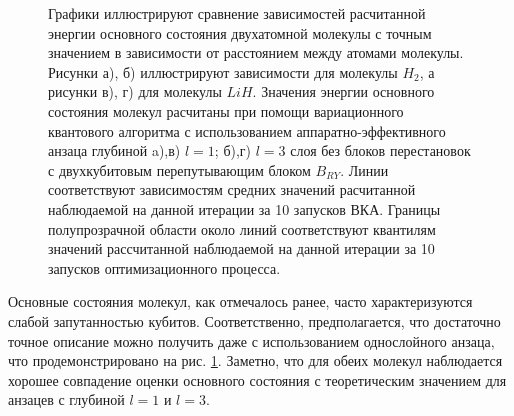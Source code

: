\documentclass[14pt]{extarticle}
\begin{document}
\begin{figure}[H]
\begin{minipage}[H]{0.48\linewidth}
\end{minipage}
\caption{Графики иллюстрируют сравнение зависимостей расчитанной энергии основного состояния двухатомной молекулы с точным значением в зависимости от расстоянием между атомами молекулы. Рисунки а), б) иллюстрируют зависимости для молекулы $H_2$, а рисунки в), г) для молекулы $LiH$. Значения энергии основного состояния молекул расчитаны при помощи вариационного квантового алгоритма с использованием аппаратно-эффективного анзаца глубиной a),в) $l = 1$; б),г) $l = 3$ слоя без блоков перестановок с двухкубитовым перепутывающим блоком $B_{RY}$. Линии соответствуют зависимостям средних значений расчитанной наблюдаемой на данной итерации за 10 запусков ВКА. Границы полупрозрачной области около линий соответствуют квантилям значений рассчитанной наблюдаемой на данной итерации за 10 запусков оптимизационного процесса.}\label{fig:2atom_mols}
\end{figure}

\qquad Основные состояния молекул, как отмечалось ранее, часто характеризуются слабой запутанностью кубитов. Соответственно, предполагается, что достаточно точное описание можно получить даже с использованием однослойного анзаца, что продемонстрировано на рис. \ref{fig:2atom_mols}. Заметно, что для обеих молекул наблюдается хорошее совпадение оценки основного состояния с теоретическим значением для анзацев с глубиной $l = 1$ и $l = 3$.
\end{document}
